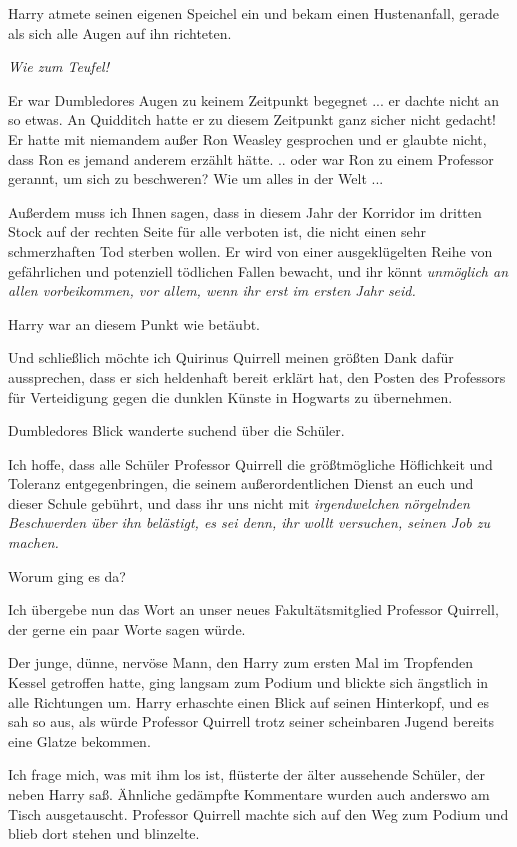 Harry atmete seinen eigenen Speichel ein und bekam einen Hustenanfall, gerade
als sich alle Augen auf ihn richteten.

\emph{Wie zum Teufel!}

Er war Dumbledores Augen zu keinem Zeitpunkt begegnet ... er dachte nicht an so
etwas. An Quidditch hatte er zu diesem Zeitpunkt ganz sicher nicht gedacht! Er
hatte mit niemandem außer Ron Weasley gesprochen und er glaubte nicht, dass Ron
es jemand anderem erzählt hätte. .. oder war Ron zu einem Professor gerannt, um
sich zu beschweren? Wie um alles in der Welt ...

\glqq{}Außerdem muss ich Ihnen sagen, dass in diesem Jahr der Korridor im
dritten Stock auf der rechten Seite für alle verboten ist, die nicht einen sehr
schmerzhaften Tod sterben wollen. Er wird von einer ausgeklügelten Reihe von
gefährlichen und potenziell tödlichen Fallen bewacht, und ihr könnt
\emph{unmöglich an allen vorbeikommen, vor allem, wenn ihr erst im ersten Jahr
seid.}\grqq{}

Harry war an diesem Punkt wie betäubt.

\glqq{}Und schließlich möchte ich Quirinus Quirrell meinen größten Dank dafür
aussprechen, dass er sich heldenhaft bereit erklärt hat, den Posten des
Professors für Verteidigung gegen die dunklen Künste in Hogwarts zu
übernehmen.\grqq{}

Dumbledores Blick wanderte suchend über die Schüler.

\glqq{}Ich hoffe, dass alle Schüler Professor Quirrell die größtmögliche
Höflichkeit und Toleranz entgegenbringen, die seinem außerordentlichen Dienst an
euch und dieser Schule gebührt, und dass ihr uns nicht mit \emph{irgendwelchen
nörgelnden Beschwerden über ihn belästigt, es sei denn, ihr wollt versuchen,
seinen Job zu machen.}\grqq{}

Worum ging es da?

\glqq{}Ich übergebe nun das Wort an unser neues Fakultätsmitglied Professor
Quirrell, der gerne ein paar Worte sagen würde.\grqq{}

Der junge, dünne, nervöse Mann, den Harry zum ersten Mal im Tropfenden Kessel
getroffen hatte, ging langsam zum Podium und blickte sich ängstlich in alle
Richtungen um. Harry erhaschte einen Blick auf seinen Hinterkopf, und es sah so
aus, als würde Professor Quirrell trotz seiner scheinbaren Jugend bereits eine
Glatze bekommen.

\glqq{}Ich frage mich, was mit ihm los ist\grqq{}, flüsterte der älter
aussehende Schüler, der neben Harry saß. Ähnliche gedämpfte Kommentare wurden
auch anderswo am Tisch ausgetauscht. Professor Quirrell machte sich auf den Weg
zum Podium und blieb dort stehen und blinzelte.

